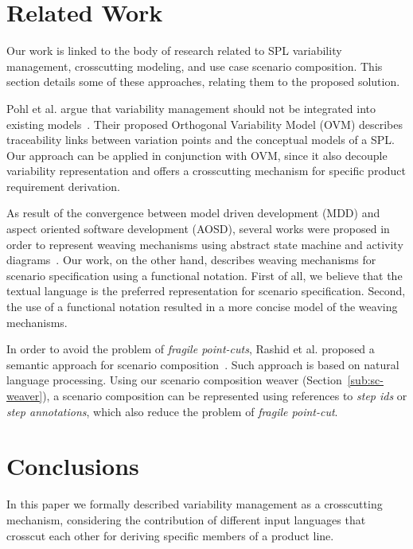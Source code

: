 \documentclass{acm_proc_article-sp}
\begin{document}
\section{Related Work}
\label{sec:related}

Our work is linked to the body of research related to SPL
variability management, crosscutting modeling, and use case scenario
composition. This section details some of these approaches, relating
them to the proposed solution.

Pohl et al. argue that variability management should not be
integrated into existing models~\cite{phol-spl-book}. Their proposed
Orthogonal Variability Model (OVM) describes traceability links
between variation points and the conceptual models of a SPL. Our
approach can be applied in conjunction with OVM, since it also
decouple variability representation and offers a crosscutting
mechanism for specific product requirement derivation.

As result of the convergence between model driven development (MDD)
and aspect oriented software development (AOSD), several works were
proposed in order to represent weaving mechanisms using abstract
state machine and activity
diagrams~\cite{noda-aom-2006,thomas-aom-2006}. Our work, on the
other hand, describes weaving mechanisms for scenario specification
using a functional notation. First of all, we believe that the
textual language is the preferred representation for scenario
specification. Second, the use of a functional notation resulted in
a more concise model of the weaving mechanisms.

In order to avoid the problem of \emph{fragile point-cuts}, Rashid
et al. proposed a semantic approach for scenario
composition~\cite{rashid-aosd-2007}. Such approach is based on
natural language processing. Using our scenario composition weaver
(Section~\ref{sub:sc-weaver}), a scenario composition can be
represented using references to \emph{step ids} or \emph{step annotations}, 
which also reduce the problem of \emph{fragile point-cut}.

\section{Conclusions}\label{sec:conclusions}

In this paper we formally described variability management as a 
crosscutting mechanism, considering the contribution 
of different input languages that crosscut each other for deriving 
specific members of a product line. 
\end{document}
